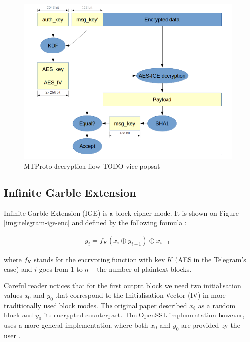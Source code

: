 \documentclass[thesis=M,english]{FITthesis}[2012/10/20]
\begin{document}
\begin{figure}[htb]
	\centering
	\includegraphics[width=1\textwidth]{telegram-decflow.png}
	\caption{MTProto decryption flow \cite{telegram-aarhus} TODO vice popsat}
	\label{img:telegram-decflow}
\end{figure}

\subsection{Infinite Garble Extension}

Infinite Garble Extension (IGE) is a block cipher mode. It is shown on Figure \ref{img:telegram-ige-enc} and defined by the following formula \cite{telegram-openssl-ige}:

\begin{gather*} 
y_i = f_K(x_i \oplus y_{i-1}) \oplus x_{i-1}
\end{gather*}

where $f_K$ stands for the encrypting function with key $K$ (AES in the Telegram's case) and $i$ goes from 1 to $n$ -- the number of plaintext blocks.

Careful reader notices that for the first output block we need two initialisation values $x_0$ and $y_0$ that correspond to the Initialisation Vector (IV) in more traditionally used block modes. The original paper described $x_0$ as a random block and $y_0$ its encrypted counterpart. The OpenSSL implementation however, uses a more general implementation where both $x_0$ and $y_0$ are provided by the user \cite{telegram-openssl-ige}.
\end{document}

